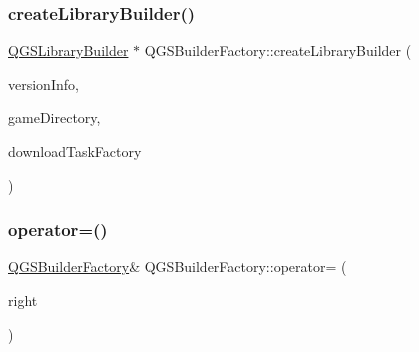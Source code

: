 \mbox{\label{class_q_g_s_builder_factory_a17287787c89b8c5f9d77f2f2e3bea007}} 
\subsubsection{\texorpdfstring{create\+Library\+Builder()}{createLibraryBuilder()}}
{\footnotesize\ttfamily \mbox{\hyperlink{class_q_g_s_library_builder}{Q\+G\+S\+Library\+Builder}} $\ast$ Q\+G\+S\+Builder\+Factory\+::create\+Library\+Builder (\begin{DoxyParamCaption}\item[{\mbox{\hyperlink{class_q_g_s_game_version_info}{Q\+G\+S\+Game\+Version\+Info}} \&}]{version\+Info,  }\item[{\mbox{\hyperlink{class_q_g_s_game_directory}{Q\+G\+S\+Game\+Directory}} $\ast$}]{game\+Directory,  }\item[{\mbox{\hyperlink{class_q_g_s_download_task_factory}{Q\+G\+S\+Download\+Task\+Factory}} $\ast$}]{download\+Task\+Factory }\end{DoxyParamCaption})}

\mbox{\label{class_q_g_s_builder_factory_a92233d3e5c3ec0a59213d4f94196db67}} 
\subsubsection{\texorpdfstring{operator=()}{operator=()}\hspace{0.1cm}{\footnotesize\ttfamily [1/2]}}
{\footnotesize\ttfamily \mbox{\hyperlink{class_q_g_s_builder_factory}{Q\+G\+S\+Builder\+Factory}}\& Q\+G\+S\+Builder\+Factory\+::operator= (\begin{DoxyParamCaption}\item[{const \mbox{\hyperlink{class_q_g_s_builder_factory}{Q\+G\+S\+Builder\+Factory}} \&}]{right }\end{DoxyParamCaption})\hspace{0.3cm}{\ttfamily [delete]}}

\mbox{\label{class_q_g_s_builder_factory_a91b7a1ee032fa1449eca3c2a6d826b3b}} 

